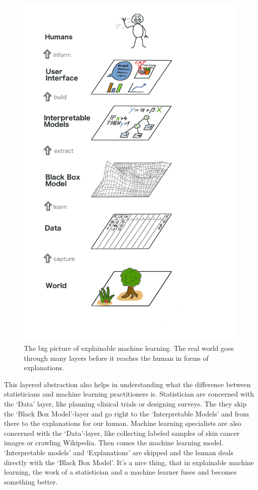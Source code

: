 \documentclass[12pt,]{krantz}
\theoremstyle{definition}
\theoremstyle{definition}
\theoremstyle{definition}
\theoremstyle{remark}
\begin{document}
\begin{figure}
\includegraphics[width=0.8\linewidth]{images/big-picture} \caption{The big picture of explainable machine learning. The real world goes through many layers before it reaches the human in forms of explanations.}\label{fig:bigpicture}
\end{figure}

This layered abstraction also helps in understanding what the difference
between statisticians and machine learning practitioners is.
Statistician are concerned with the `Data' layer, like planning clinical
trials or designing surveys. The they skip the `Black Box Model'-layer
and go right to the `Interpretable Models' and from there to the
explanations for our human. Machine learning specialists are also
concerned with the `Data'-layer, like collecting labeled samples of skin
cancer images or crawling Wikipedia. Then comes the machine learning
model. `Interpretable models' and `Explanations' are skipped and the
human deals directly with the `Black Box Model'. It's a nice thing, that
in explainable machine learning, the work of a statistician and a
machine learner fuses and becomes something better.
\end{document}
